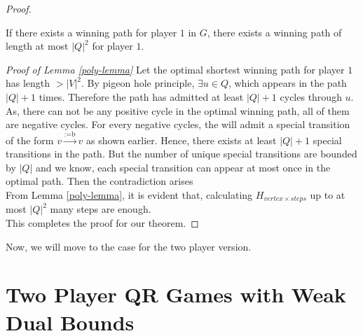 \begin{proof}
\begin{lemma}
 \label{poly-lemma}
  If there exists a winning path for player $1$ in $G$, there exists a winning path of length at most $|Q|^2$ for player $1$.
  \end{lemma}
  \vskip 0.1cm
  \textit{Proof of Lemma \ref{poly-lemma}} Let the optimal shortest winning path for player $1$ has length $>|V|^2$. By pigeon hole principle, $\exists u \in Q$, which appears in the path $|Q|+1$ times. Therefore the path has admitted at least $|Q|+1$ cycles through $u$. As, there can not be any positive cycle in the optimal winning path, all of them are negative cycles. For every negative cycles, the will admit a special transition of the form $v \xrightarrow{\text{:=b}} v$ as shown earlier. Hence, there exists at least $|Q|+1$ special transitions in the path. But the number of unique special transitions are bounded by $|Q|$ and we know, each special transition can appear at most once in the optimal path. Then the contradiction arises\\
 \vskip 0.3cm
  From Lemma \ref{poly-lemma}, it is evident that, calculating $H_{vertex \times steps}$ up to at most $|Q|^2$ many steps are enough.\\
  This completes the proof for our theorem.
 \end{proof}
 \vskip 0.1cm
 Now, we will move to the case for the two player version.
 
 
\section{Two Player QR Games with Weak Dual Bounds}

